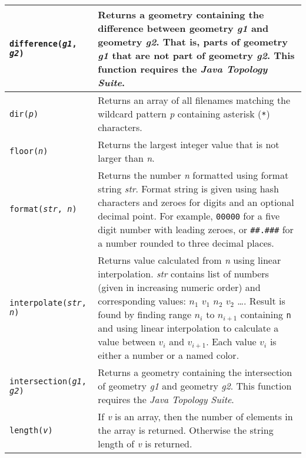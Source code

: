 \begin{longtable}{|p{5cm}|p{7cm}|}
\hline

\texttt{difference(\textit{g1}, \textit{g2})} &
Returns a geometry containing the difference between
geometry \textit{g1} and geometry \textit{g2}.  That is, parts
of geometry \textit{g1} that are not part of geometry \textit{g2}.
This function requires the \textit{Java Topology Suite}. \\

\hline

\texttt{dir(\textit{p})} &
Returns an array of all filenames matching the wildcard
pattern \textit{p} containing asterisk (\texttt{*}) characters. \\

\hline

\texttt{floor(\textit{n})} &
Returns the largest integer value that is not larger than \textit{n}. \\

\hline

\texttt{format(\textit{str}, \textit{n})} &
Returns the number \textit{n} formatted using format string \textit{str}.
Format string is given using hash characters and zeroes for digits
and an optional decimal point.
For example,
\texttt{00000} for a five digit number with leading zeroes,
or
\texttt{\#\#.\#\#\#} for a number rounded to three decimal places.  \\

\hline

\texttt{interpolate(\textit{str}, \textit{n})} &
Returns value calculated from \textit{n} using linear interpolation.
\textit{str} contains list of numbers (given in increasing numeric
order) and corresponding values:
$n_{1}$ $v_{1}$ $n_{2}$ $v_{2}$ \ldots.
Result is found by finding range
$n_{i}$
to
$n_{i+1}$
containing \texttt{n} and
using linear interpolation to calculate a value between
$v_{i}$
and
$v_{i+1}$.
Each value $v_{i}$ is either a number or a named color.  \\

\hline

\texttt{intersection(\textit{g1}, \textit{g2})} &
Returns a geometry containing the intersection
of geometry \textit{g1} and geometry \textit{g2}.
This function requires the \textit{Java Topology Suite}. \\

\hline

\texttt{length(\textit{v})} &
If \textit{v} is an array, then the number of elements in the
array is returned.  Otherwise the string length of \textit{v} is returned. \\


\end{longtable}
